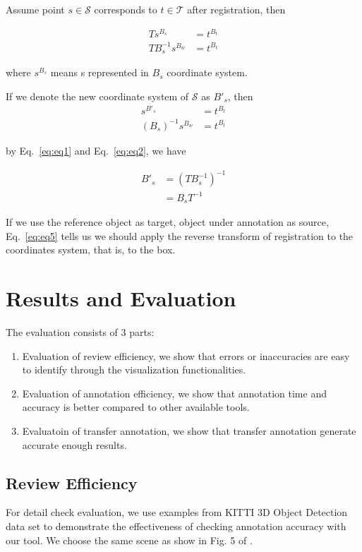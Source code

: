 \documentclass[letterpaper, 10 pt, conference]{ieeeconf}  %
\begin{document}
Assume point $s \in \mathcal{S}$ corresponds to $t \in \mathcal{T}$ after registration, then


\begin{align}
T s^{B_s} &= t^{B_t}\\
T B_s^{-1}s^{B_w} &= t^{B_t} \label{eq:eq1}
\end{align}

where $s^{B_s}$ means s represented in $B_s$ coordinate system.

If we denote the new coordinate system of $\mathcal{S}$ as $B'_s$, then
\begin{align} 
s^{B'_s} &= t^{B_t}\\
(B_s)^{-1}s^{B_w} &= t^{B_t} \label{eq:eq2}
\end{align}


by Eq.~\eqref{eq:eq1} and Eq.~\eqref{eq:eq2}, we have

\begin{align}
{B'_s} & = (T B_s^{-1})^{-1}\\
       & = B_s T^{-1} \label{eq:eq5}
\end{align}

If we use the reference object as target, object under annotation as source, Eq.~\eqref{eq:eq5} tells us we should apply the reverse transform of registration to the coordinates system, that is, to the box.



\section{Results and Evaluation}
\label {Metrics}

The evaluation consists of 3 parts:
\begin{enumerate}
	\item Evaluation of review efficiency, we show that errors or inaccuracies are easy to identify through the visualization functionalities.
	\item Evaluation of annotation efficiency, we show that annotation time and accuracy is better compared to other available tools.
	\item Evaluatoin of transfer annotation, we show that transfer annotation generate accurate enough results.
\end{enumerate}

\subsection{Review Efficiency}
For detail check evaluation, we use examples from KITTI 3D Object Detection data \cite{Geiger2012CVPR} set to demonstrate the effectiveness of checking annotation accuracy with our tool. We choose the same scene as show in  Fig. 5 of \cite{pointatme}.
\end{document}
